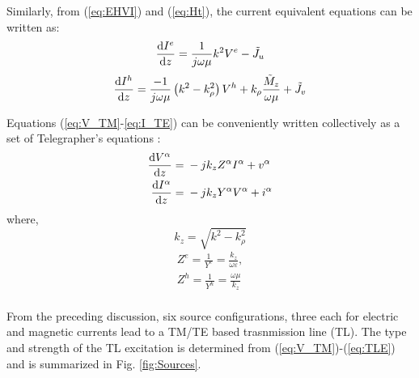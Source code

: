 \documentclass[11pt]{article}
\newcommand{\ti}[1]{\tilde{#1}} %
\renewcommand{\O}{\omega}  %
\newcommand{\E}{\varepsilon}  %
\renewcommand{\u}{\mu}  %
\newcommand{\p}{\rho}  %
\renewcommand{\^}{\hat}  %
\begin{document}
  Similarly, from (\ref{eq:EHVI}) and (\ref{eq:Ht}), the current equivalent equations can be written as:
  \begin{equation}
    \dv{I^e}{z} = \frac{1}{j \O \u}k^2 V^e - \ti{J}_u
    \label{eq:I_TM}
  \end{equation}
  \begin{equation}
    \dv{I^h}{z} = \frac{-1}{j \O \u}\left( k^2 - k_{\p}^2 \right)V^h + k_{\p}\frac{\ti{M}_z}{\O \u} + \ti{J}_v
    \label{eq:I_TE}
  \end{equation}

  Equations (\ref{eq:V_TM}-\ref{eq:I_TE}) can be conveniently written collectively as a set of Telegrapher's equations \cite[p. 1166]{michalski2005electromagnetic}:
  \begin{subequations}
    \begin{align}
      \dv{V^{\alpha}}{z} ={}& -j k_z Z^{\alpha}I^{\alpha} + v^{\alpha}
      \label{eq:TL_V}\\
      \dv{I^{\alpha}}{z} ={}& -j k_z Y^{\alpha}V^{\alpha} + i^{\alpha}
      \label{eq:TL_I}
    \end{align}
    \label{eq:TLE}
  \end{subequations}
  where,
  \begin{equation}
    k_z = \sqrt{k^2 - k_{\p}^2}
    \label{eq:k_z}
  \end{equation}
  \begin{equation}
    \begin{split}
      Z^e = \frac{1}{Y^e} = \frac{k_z}{\O \E},\\
      Z^h = \frac{1}{Y^h} = \frac{\O \u}{k_z}\\
    \end{split}
    \label{eq:Z}
  \end{equation}

  From the preceding discussion, six source configurations, three each for electric and magnetic currents lead to a TM/TE based trasnmission line (TL). The type and strength of the TL excitation is determined from (\ref{eq:V_TM})-(\ref{eq:TLE}) and is summarized in Fig. \ref{fig:Sources}.
\end{document}
